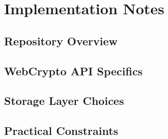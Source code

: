 %
%

\chapter{Implementation Notes}

\section{Repository Overview}

\section{WebCrypto API Specifics}

\section{Storage Layer Choices}

\section{Practical Constraints}

